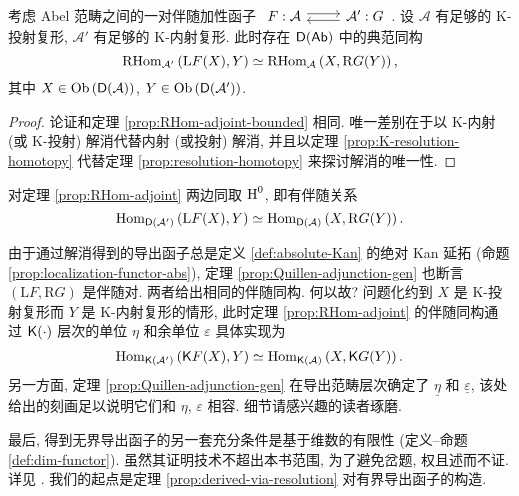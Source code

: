 \begin{theorem}\label{prop:RHom-adjoint}
	考虑 Abel 范畴之间的一对伴随加性函子
	$\begin{tikzcd}
		F: \mathcal{A} \arrow[r, shift left] & \mathcal{A}' \arrow[l, shift left] : G
	\end{tikzcd}$.
	设 $\mathcal{A}$ 有足够的 K-投射复形, $\mathcal{A}'$ 有足够的 K-内射复形. 此时存在 $\mathsf{D}(\mathsf{Ab})$ 中的典范同构
	\[ \operatorname{RHom}_{\mathcal{A'}}\left(\mathrm{L}F(X), Y\right) \simeq \operatorname{RHom}_{\mathcal{A}}\left(X, \mathrm{R}G(Y) \right), \]
	其中 $X \in \operatorname{Ob}\left(\mathsf{D}(\mathcal{A})\right)$, $Y \in \operatorname{Ob}\left(\mathsf{D}(\mathcal{A}')\right)$.
\end{theorem}
\begin{proof}
	论证和定理 \ref{prop:RHom-adjoint-bounded} 相同. 唯一差别在于以 K-内射 (或 K-投射) 解消代替内射 (或投射) 解消, 并且以定理 \ref{prop:K-resolution-homotopy} 代替定理 \ref{prop:resolution-homotopy} 来探讨解消的唯一性.
\end{proof}

\begin{remark}
	对定理 \ref{prop:RHom-adjoint} 两边同取 $\operatorname{H}^0$, 即有伴随关系
	\[ \operatorname{Hom}_{\mathsf{D}(\mathcal{A'})}\left(\mathrm{L}F(X), Y\right) \simeq \operatorname{Hom}_{\mathsf{D}(\mathcal{A})}\left(X, \mathrm{R}G(Y) \right). \]

	由于通过解消得到的导出函子总是定义 \ref{def:absolute-Kan} 的绝对 Kan 延拓 (命题 \ref{prop:localization-functor-abs}), 定理 \ref{prop:Quillen-adjunction-gen} 也断言 $(\mathrm{L}F, \mathrm{R}G)$ 是伴随对. 两者给出相同的伴随同构. 何以故? 问题化约到 $X$ 是 K-投射复形而 $Y$ 是 K-内射复形的情形, 此时定理 \ref{prop:RHom-adjoint} 的伴随同构通过 $\mathsf{K}(\cdot)$ 层次的单位 $\eta$ 和余单位 $\varepsilon$ 具体实现为
	\begin{align*}
		\operatorname{Hom}_{\mathsf{K}(\mathcal{A}')}\left( \mathsf{K}F(X), Y\right) \simeq \operatorname{Hom}_{\mathsf{K}(\mathcal{A})}\left( X, \mathsf{K}G(Y) \right).
	\end{align*}
	另一方面, 定理 \ref{prop:Quillen-adjunction-gen} 在导出范畴层次确定了 $\underline{\eta}$ 和 $\underline{\varepsilon}$, 该处给出的刻画足以说明它们和 $\eta$, $\varepsilon$ 相容. 细节请感兴趣的读者琢磨.
\end{remark}

最后, 得到无界导出函子的另一套充分条件是基于维数的有限性 (定义--命题 \ref{def:dim-functor}). 虽然其证明技术不超出本书范围, 为了避免岔题, 权且述而不证. 详见 {\cite[Tags 07K6, 07K7]{stacks}}. 我们的起点是定理 \ref{prop:derived-via-resolution} 对有界导出函子的构造.

